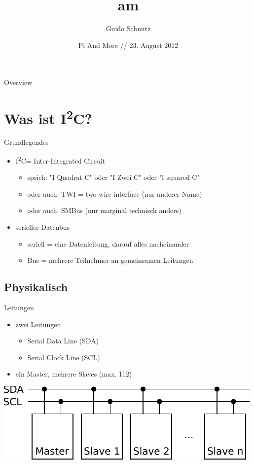\documentclass{beamer}
\title{\ItC am \RPi }
\author{Guido Schmitz}
\date{Pi And More // 23. August 2012}
\newcommand{\ItC}{I\textsuperscript{2}C\xspace}
\begin{document}
\begin{frame}[plain]
 \titlepage
\end{frame}

\begin{frame}{Overview}
 \tableofcontents
\end{frame}


\section{Was ist \ItC?}

\begin{frame}{Grundlegendes}
 \begin{itemize}
  \item \ItC = Inter-Integrated Circuit
   \begin{itemize}
    \item sprich: "I Quadrat C" oder "I Zwei C" oder "I squared C"
    \item oder auch: TWI = two wire interface (nur anderer Name)
    \item oder auch: SMBus (nur marginal technisch anders)
   \end{itemize}
  \item serieller Datenbus
   \begin{itemize}
    \item seriell = eine Datenleitung, darauf alles nacheinander
    \item Bus = mehrere Teilnehmer an gemeinsamen Leitungen
   \end{itemize}
 \end{itemize}
\end{frame}

\subsection{Physikalisch}

\begin{frame}{Leitungen}
 \begin{itemize}
  \item zwei Leitungen
   \begin{itemize}
    \item Serial Data Line (SDA)
    \item Serial Clock Line (SCL)
   \end{itemize}
  \item ein Master, mehrere Slaves (max. 112)
 \end{itemize}
 \includegraphics[width=\textwidth]{bus}
\end{frame}
\end{document}
